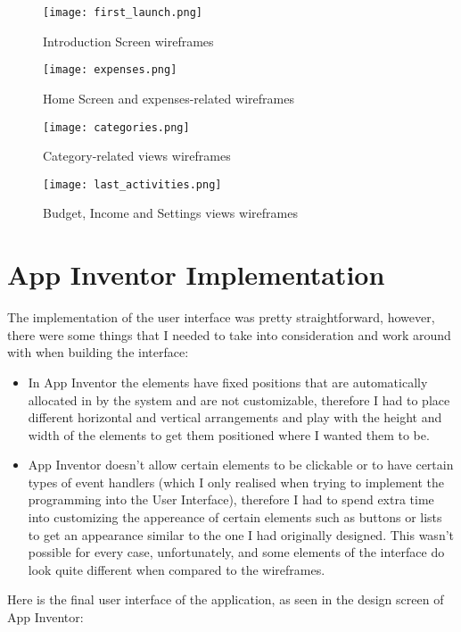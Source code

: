 \begin{figure}
  \caption{Introduction Screen wireframes}
  \centering
  \texttt{[image: first\_launch.png]}
\end{figure}

\begin{figure}
  \caption{Home Screen and expenses-related wireframes}
  \centering
  \texttt{[image: expenses.png]}
\end{figure}

\begin{figure}
  \caption{Category-related views wireframes}
  \centering
  \texttt{[image: categories.png]}
\end{figure}

\begin{figure}
  \caption{Budget, Income and Settings views wireframes}
  \centering
  \texttt{[image: last\_activities.png]}
\end{figure}

\section{App Inventor Implementation}
The implementation of the user interface was pretty straightforward, however, there were some things that I needed to take into consideration and work around with when building the interface:
\begin{itemize}
  \item In App Inventor the elements have fixed positions that are automatically allocated in by the system and are not customizable, therefore I had to place different horizontal and vertical arrangements and play with the height and width of the elements to get them positioned where I wanted them to be.
  \item App Inventor doesn't allow certain elements to be clickable or to have certain types of event handlers (which I only realised when trying to implement the programming into the User Interface), therefore I had to spend extra time into customizing the appereance of certain elements such as buttons or lists to get an appearance similar to the one I had originally designed. This wasn't possible for every case, unfortunately, and some elements of the interface do look quite different when compared to the wireframes.
\end{itemize}

Here is the final user interface of the application, as seen in the design screen of App Inventor:

